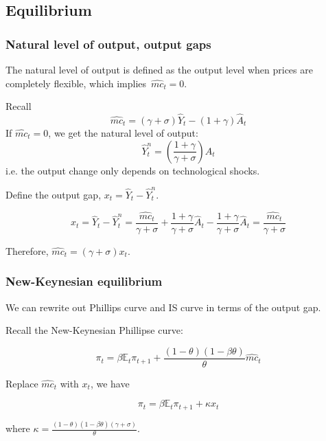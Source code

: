 \documentclass[10pt,a4]{article}
\begin{document}
\par\null

\subsection{Equilibrium}

{\label{481134}}

\subsubsection{Natural level of output, output
gaps}

{\label{616482}}

The natural level of output is defined as the output level when prices
are completely flexible, which implies~\(\hat{mc}_t = 0\).

Recall $$\hat{mc}_t = (\gamma+\sigma)\hat Y_t - (1+\gamma)\hat A_t$$
If $\hat{mc}_t = 0$, we get the natural level of output: 
$$ \hat Y_t^n = \left(\frac{1+\gamma}{\gamma+\sigma}\right)\hat A_t$$
i.e. the output change only depends on technological shocks.

Define the output gap, $x_t = \hat Y_t - \hat Y_t^n$. 

$$ x_t = \hat Y_t - \hat Y_t^n = \frac{\hat{mc}_t}{\gamma+\sigma} + \frac{1+\gamma}{\gamma+\sigma}\hat A_t - \frac{1+\gamma}{\gamma+\sigma}\hat A_t = \frac{\hat{mc}_t}{\gamma+\sigma} $$

Therefore, $\hat{mc}_t = (\gamma+\sigma)x_t$.

\subsubsection{New-Keynesian
equilibrium}

{\label{362724}}

We can rewrite out Phillips curve and IS curve in terms of the output
gap.~ ~

Recall the New-Keynesian Phillipse curve:

$$ \pi_t = \beta\mathbb{E}_t\pi_{t+1} + \frac{(1-\theta)(1-\beta\theta)}{\theta}\hat{mc}_t $$

Replace $\hat{mc}_t$ with $x_t$, we have

\begin{equation}
\label{eq:ps}
\pi_t = \beta\mathbb{E}_t\pi_{t+1} + \kappa x_t
\end{equation}

where $\kappa = \frac{(1-\theta)(1-\beta\theta)(\gamma+\sigma)}{\theta}$.
\end{document}
